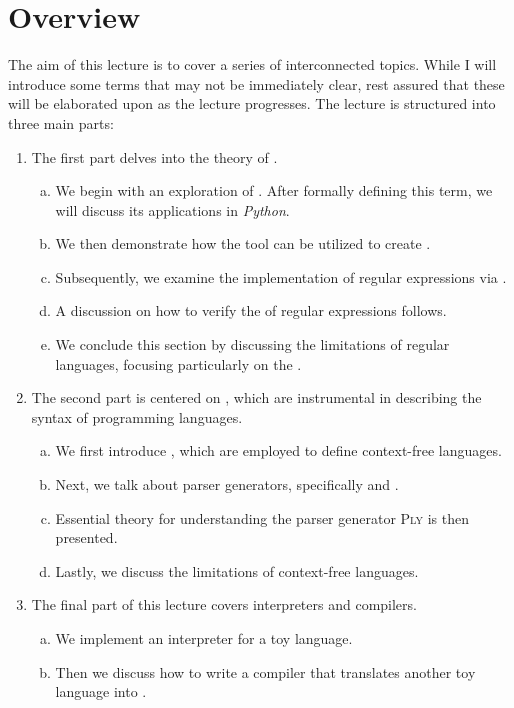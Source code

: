 \section{Overview}
The aim of this lecture is to cover a series of interconnected topics. While I will introduce some terms that may not be immediately clear, rest assured that these will be elaborated upon as the lecture progresses. The lecture is structured into three main parts:

\begin{enumerate}
\item The first part delves into the theory of .
  \begin{enumerate}[(a)]
  \item We begin with an exploration of . After formally defining this term, we will discuss its applications in \textsl{Python}.
  \item We then demonstrate how the  tool can be utilized to create .
  \item Subsequently, we examine the implementation of regular expressions via .
  \item A discussion on how to verify the  of regular expressions follows.
  \item We conclude this section by discussing the limitations of regular languages, focusing particularly on the .
  \end{enumerate}
  
\item The second part is centered on , which are instrumental in describing the syntax of programming languages.
  \begin{enumerate}[(a)]
  \item We first introduce , which are employed to define context-free languages.
  \item Next, we talk about parser generators, specifically  and .
  \item Essential theory for understanding the parser generator \textsc{Ply} is then presented.
  \item Lastly, we discuss the limitations of context-free languages.
  \end{enumerate}

\item The final part of this lecture covers interpreters and compilers.
  \begin{enumerate}[(a)]
  \item We implement an interpreter for a toy language.
  \item Then we discuss how to write a compiler that translates another toy language into .
  \end{enumerate}
\end{enumerate}


